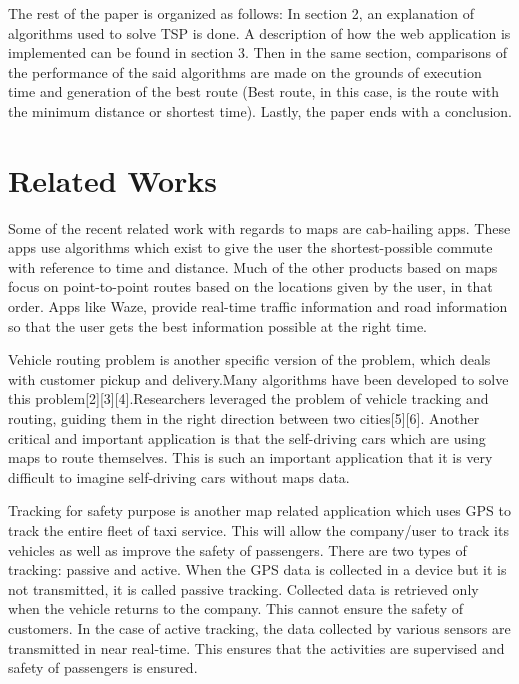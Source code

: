 \documentclass[conference]{IEEEtran}
\begin{document}
The rest of the paper is organized as follows: In section 2, an explanation of algorithms used to solve TSP is done. A description of how the web application is implemented can be found in section 3. Then in the same section, comparisons of the performance of the said algorithms are made on the grounds of execution time and generation of the best route (Best route, in this case, is the route with the minimum distance or shortest time). Lastly, the paper ends with a conclusion.

\section {Related Works}
Some of the recent related work with regards to maps are cab-hailing apps. These apps use algorithms which exist to give the user the shortest-possible commute with reference to time and distance. Much of the other products based on maps focus on point-to-point routes based on the locations given by the user, in that order. Apps like Waze, provide real-time traffic information and road information so that the user gets the best information possible at the right time.

Vehicle routing problem is another specific version of the problem, which deals with customer pickup and delivery.Many algorithms have been developed to solve this problem[2][3][4].Researchers leveraged the problem of vehicle tracking and routing, guiding them in the right direction between two cities[5][6]. Another critical and important application is that the self-driving cars which are using maps to route themselves. This is such an important application that it is very difficult to imagine self-driving cars without maps data.

Tracking for safety purpose is another map related application which uses GPS to track the entire fleet of taxi service. This will allow the company/user to track its vehicles as well as improve the safety of passengers. There are two types of tracking: passive and active. When the GPS data is collected in a device but it is not transmitted, it is called passive tracking. Collected data is retrieved only when the vehicle returns to the company. This cannot ensure the safety of customers. In the case of active tracking, the data collected by various sensors are transmitted in near real-time. This ensures that the activities are supervised and safety of passengers is ensured.  
\end{document}
